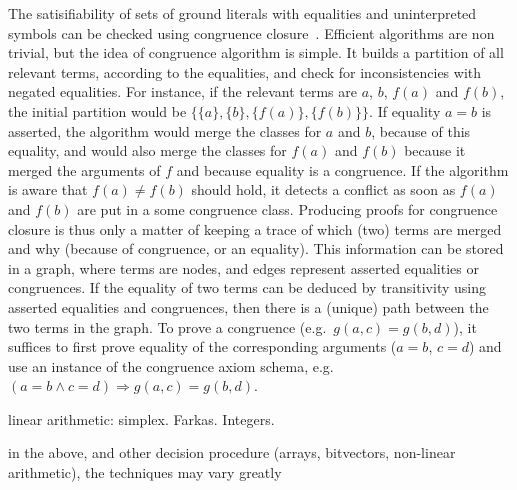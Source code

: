 \documentclass{llncs}
\begin{document}
The satisifiability of sets of ground literals with equalities and uninterpreted
symbols can be checked using congruence closure~\cite{Nelson2,Nieuwenhuis6}.
Efficient algorithms are non trivial, but the idea of congruence algorithm is
simple.  It builds a partition of all relevant terms, according to the
equalities, and check for inconsistencies with negated equalities.  For
instance, if the relevant terms are $a$, $b$, $f(a)$ and $f(b)$, the initial
partition would be $\big\{\{a\}, \{b\}, \{f(a)\}, \{f(b)\}\big\}$.  If equality
$a=b$ is asserted, the algorithm would merge the classes for $a$ and $b$,
because of this equality, and would also merge the classes for $f(a)$ and $f(b)$
because it merged the arguments of $f$ and because equality is a congruence.  If
the algorithm is aware that $f(a) \neq f(b)$ should hold, it detects a conflict
as soon as $f(a)$ and $f(b)$ are put in a some congruence class.  Producing
proofs for congruence closure is thus only a matter of keeping a trace of which
(two) terms are merged and why (because of congruence, or an equality).  This
information can be stored in a graph, where terms are nodes, and edges represent
asserted equalities or congruences.  If the equality of two terms can be deduced
by transitivity using asserted equalities and congruences, then there is a
(unique) path between the two terms in the graph.  To prove a congruence
(e.g.\ $g(a,c) = g(b,d)$), it suffices to first prove equality of the
corresponding arguments ($a=b$, $c=d$) and use an instance of the congruence
axiom schema, e.g.\ $(a=b \wedge c=d) \Rightarrow g(a,c) = g(b,d)$.

linear arithmetic: simplex.  Farkas.  Integers.

in the above, and other decision procedure (arrays, bitvectors, non-linear arithmetic), the techniques may vary greatly





\end{document}

